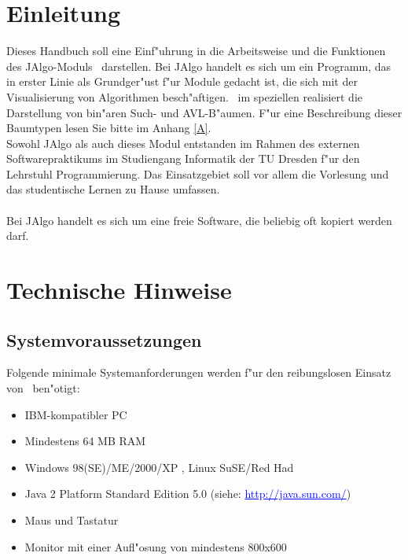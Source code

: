 
\section{Einleitung}

Dieses Handbuch soll eine Einf"uhrung in die Arbeitsweise und die Funktionen des JAlgo-Moduls
\AVL \ darstellen. Bei JAlgo handelt es sich um ein Programm, das in erster Linie als Grundger"ust f"ur
Module gedacht ist, die sich mit der Visualisierung von Algorithmen besch"aftigen. \AVL \ im speziellen
realisiert die Darstellung von bin"aren Such- und AVL-B"aumen. F"ur eine Beschreibung dieser Baumtypen
lesen Sie bitte im Anhang \ref{A}. \\
Sowohl JAlgo als auch dieses Modul entstanden im Rahmen des externen Softwarepraktikums im Studiengang Informatik 
der TU Dresden f"ur den Lehrstuhl Programmierung. Das Einsatzgebiet soll vor allem die Vorlesung und das
studentische Lernen zu Hause umfassen. \\
\\
Bei JAlgo handelt es sich um eine freie Software, die beliebig oft kopiert werden darf.


\bigskip

\section{Technische Hinweise}
\subsection{Systemvoraussetzungen}

Folgende minimale Systemanforderungen werden f"ur den reibungslosen Einsatz von \AVL \ ben"otigt:

\begin{itemize}

\item IBM-kompatibler PC 

\item Mindestens 64 MB RAM

\item {\sc Windows} 98(SE)/ME/2000/XP , {\sc Linux} SuSE/Red Had 	

\item Java 2 Platform Standard Edition 5.0 	{\small (siehe: \textcolor{blue}{\underline{http://java.sun.com/}}) }

\item Maus und Tastatur	

\item Monitor mit einer Aufl"osung von mindestens 800x600 

\end{itemize}


